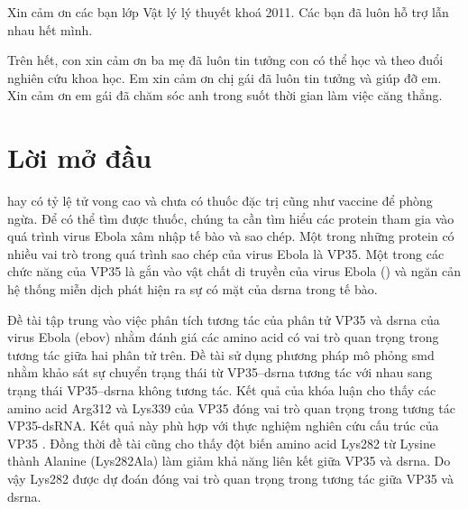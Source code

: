 \documentclass[12pt,a4paper,reqno, oneside]{book}
\begin{document}
Xin cảm ơn các bạn lớp Vật lý lý thuyết khoá 2011. Các bạn đã luôn hỗ trợ lẫn nhau hết mình.

Trên hết, con xin cảm ơn ba mẹ đã luôn tin tưởng con có thể học và theo đuổi nghiên cứu khoa học. Em xin cảm ơn chị gái đã luôn tin tưởng và giúp đỡ em. Xin cảm ơn em gái đã chăm sóc anh trong suốt thời gian làm việc căng thẳng.

\printglossaries
{}
\clearpage

\newpage
\pagestyle{fancy}
\listoffigures




\newpage
{}
\chapter*{Lời mở đầu}
	 hay  có tỷ lệ tử vong cao và chưa có thuốc đặc trị cũng như vaccine để phòng ngừa. Để có thể tìm được thuốc, chúng ta cần tìm hiểu các protein tham gia vào quá trình virus Ebola xâm nhập tế bào và sao chép. Một trong những protein có nhiều vai trò trong quá trình sao chép của virus Ebola là VP35. Một trong các chức năng của VP35 là gắn vào vật chất di truyền của virus Ebola () và ngăn cản hệ thống miễn dịch phát hiện ra sự có mặt của \gls{dsrna} trong tế bào.
	
	Đề tài tập trung vào việc phân tích tương tác của phân tử VP35 và \gls{dsrna} của virus Ebola (\gls{ebov}) nhằm đánh giá các amino acid có vai trò quan trọng trong tương tác giữa hai phân tử trên. Đề tài sử dụng phương pháp mô phỏng \gls{smd} nhằm khảo sát sự chuyển trạng thái từ VP35--\gls{dsrna} tương tác với nhau sang trạng thái VP35--\gls{dsrna} không tương tác. Kết quả của khóa luận cho thấy các amino acid Arg312 và Lys339 của VP35 đóng vai trò quan trọng trong tương tác VP35-dsRNA. Kết quả này phù hợp với thực nghiệm nghiên cứu cấu trúc của VP35 \cite{Leung2010}. Đồng thời đề tài cũng cho thấy đột biến amino acid Lys282 từ Lysine thành Alanine (Lys282Ala) làm giảm khả năng liên kết giữa VP35 và \gls{dsrna}. Do vậy Lys282 được dự đoán đóng vai trò quan trọng trong tương tác giữa VP35 và \gls{dsrna}.
	
	
\end{document}
